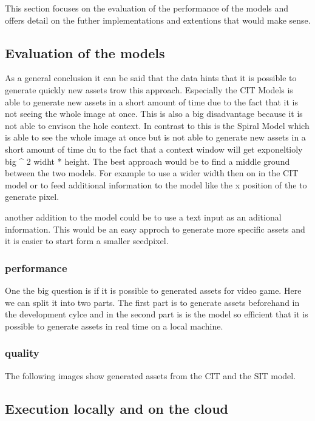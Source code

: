 
This section focuses on the evaluation of the performance of the models and offers detail on the futher implementations and extentions that would make sense.

\subsection{Evaluation of the models}
    
    As a general conclusion it can be said that the data hints that it is possible to generate quickly new assets trow this approach. Especially the CIT Models is able to generate new assets in a short amount of time due to the fact that it is not seeing the whole image at once. This is also a big disadvantage because it is not able to envison the hole context. In contrast to this is the Spiral Model which is able to see the whole image at once but is not able to generate new assets in a short amount of time du to the fact that a context window will get exponeltioly big ^ 2 widht * height. The best approach would be to find a middle ground between the two models. For example to use a wider width then on in the CIT model or to feed additional information to the model like the x position of the to generate pixel.

    another addition to the model could be to use a text input as an aditional information. This would be an easy approch to generate more specific assets and it is easier to start form a smaller seedpixel.

    \subsubsection{performance}
    One the big question is if it is possible to generated assets for video game. Here we can split it into two parts. The first part is to generate assets beforehand in the development cylce and in the second part is is the model so efficient that it is possible to generate assets in real time on a local machine.

    \subsubsection{quality}
    The following images show generated assets from the CIT and the SIT model. 


\subsection{Execution locally and on the cloud}
    

